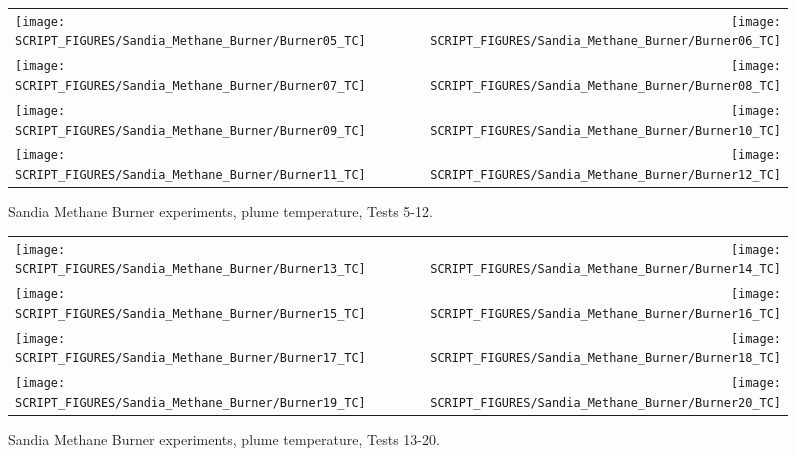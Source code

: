 \newpage

\begin{figure}[p]
\begin{tabular*}{\textwidth}{l@{\extracolsep{\fill}}r}
\texttt{[image: SCRIPT\_FIGURES/Sandia\_Methane\_Burner/Burner05\_TC]} &
\texttt{[image: SCRIPT\_FIGURES/Sandia\_Methane\_Burner/Burner06\_TC]} \\
\texttt{[image: SCRIPT\_FIGURES/Sandia\_Methane\_Burner/Burner07\_TC]} &
\texttt{[image: SCRIPT\_FIGURES/Sandia\_Methane\_Burner/Burner08\_TC]} \\
\texttt{[image: SCRIPT\_FIGURES/Sandia\_Methane\_Burner/Burner09\_TC]} &
\texttt{[image: SCRIPT\_FIGURES/Sandia\_Methane\_Burner/Burner10\_TC]} \\
\texttt{[image: SCRIPT\_FIGURES/Sandia\_Methane\_Burner/Burner11\_TC]} &
\texttt{[image: SCRIPT\_FIGURES/Sandia\_Methane\_Burner/Burner12\_TC]}
\end{tabular*}
\caption[Sandia Methane Burner, plume temperature, Tests 5-12]{Sandia Methane Burner experiments, plume temperature, Tests 5-12.}
\label{Sandia_Methane_Burner_TC_2}
\end{figure}

\begin{figure}[p]
\begin{tabular*}{\textwidth}{l@{\extracolsep{\fill}}r}
\texttt{[image: SCRIPT\_FIGURES/Sandia\_Methane\_Burner/Burner13\_TC]} &
\texttt{[image: SCRIPT\_FIGURES/Sandia\_Methane\_Burner/Burner14\_TC]} \\
\texttt{[image: SCRIPT\_FIGURES/Sandia\_Methane\_Burner/Burner15\_TC]} &
\texttt{[image: SCRIPT\_FIGURES/Sandia\_Methane\_Burner/Burner16\_TC]} \\
\texttt{[image: SCRIPT\_FIGURES/Sandia\_Methane\_Burner/Burner17\_TC]} &
\texttt{[image: SCRIPT\_FIGURES/Sandia\_Methane\_Burner/Burner18\_TC]} \\
\texttt{[image: SCRIPT\_FIGURES/Sandia\_Methane\_Burner/Burner19\_TC]} &
\texttt{[image: SCRIPT\_FIGURES/Sandia\_Methane\_Burner/Burner20\_TC]}
\end{tabular*}
\caption[Sandia Methane Burner, plume temperature, Tests 13-20]{Sandia Methane Burner experiments, plume temperature, Tests 13-20.}
\label{Sandia_Methane_Burner_TC_3}
\end{figure}

